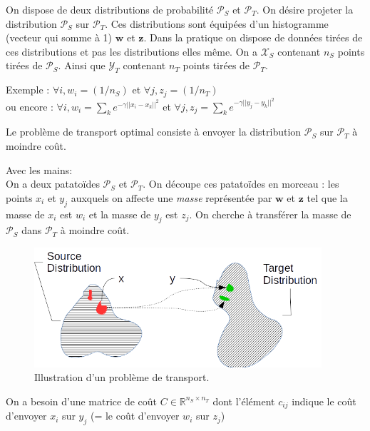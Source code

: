
\label{day:22-06-2016}



On dispose de deux distributions de probabilité $\mathcal{P}_S$ et $\mathcal{P}_T$.
On désire projeter la distribution $\mathcal{P}_S$ sur $\mathcal{P}_T$.
Ces distributions sont équipées d'un histogramme (vecteur qui somme à 1) $\mathbf{w}$ et $\mathbf{z}$.
Dans la pratique on dispose de données tirées de ces distributions et pas les 
distributions elles même. 
On a $\mathcal{X}_S$ contenant $n_S$ points tirées de $\mathcal{P}_S$.
Ainsi que $\mathcal{Y}_T$ contenant $n_T$ points tirées de $\mathcal{P}_T$.

Exemple : $\forall i, w_i = (1/n_S)$ et $\forall j, z_j = (1/n_T)$\\
ou encore : $\forall i, w_i = \sum_k e^{-\gamma ||x_i-x_k||^2}$ et $\forall j, z_j = \sum_k e^{-\gamma ||y_j-y_k||^2}$

Le problème de transport optimal consiste à envoyer la distribution $\mathcal{P}_S$ 
sur $\mathcal{P}_T$ à moindre coût.

Avec les mains:\\
On a deux patatoïdes $\mathcal{P}_S$ et $\mathcal{P}_T$. 
On découpe ces patatoïdes en morceau : les points $x_i$ et $y_j$ auxquels on affecte une \emph{masse}
représentée par $\mathbf w$ et $\mathbf z$ tel que la masse de $x_i$ est $w_i$ et la masse de $y_j$ est $z_j$.
On cherche à transférer la masse de $\mathcal{P}_S$ dans $\mathcal{P}_T$ à moindre coût.

\begin{figure}[htbp]
  \centering
  \includegraphics[width=0.95\textwidth]{fig/22-06-2016/ot.png}
  \caption{Illustration d'un problème de transport.}
  \label{fig:label}
\end{figure}

On a besoin d'une matrice de coût $C \in \mathbb{R}^{n_S\times n_T}$ dont 
l'élément $c_{ij}$ indique le coût d'envoyer $x_i$ sur $y_j$ 
(= le coût d'envoyer $w_i$ sur $z_j$)

